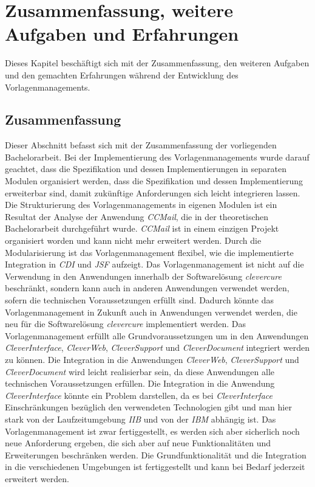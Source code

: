 \chapter{Zusammenfassung, weitere Aufgaben und Erfahrungen}
\label{cha:Zusammenfassung}
Dieses Kapitel beschäftigt sich mit der Zusammenfassung, den weiteren Aufgaben und den gemachten Erfahrungen während der Entwicklung des Vorlagenmanagements. 
\section{Zusammenfassung}
Dieser Abschnitt befasst sich mit der Zusammenfassung der vorliegenden  Bachelorarbeit.
\newline
\newline
Bei der Implementierung des Vorlagenmanagements wurde darauf geachtet, dass die Spezifikation und dessen Implementierungen in separaten Modulen organisiert werden, dass die Spezifikation und dessen Implementierung erweiterbar sind, damit zukünftige Anforderungen sich leicht integrieren lassen. Die Strukturierung des Vorlagenmanagements  in eigenen Modulen ist ein Resultat der Analyse der Anwendung \emph{CCMail}, die in der theoretischen Bachelorarbeit durchgeführt wurde. \emph{CCMail} ist in einem einzigen Projekt organisiert worden und kann nicht mehr erweitert werden. Durch die Modularisierung ist das Vorlagenmanagement flexibel, wie die implementierte Integration in \emph{CDI} und \emph{JSF} aufzeigt.
\newline
\newline
Das Vorlagenmanagement ist nicht auf die Verwendung in den Anwendungen innerhalb der Softwarelösung \emph{clevercure} beschränkt, sondern kann auch in anderen Anwendungen verwendet werden, sofern die technischen Voraussetzungen erfüllt sind. Dadurch könnte das Vorlagenmanagement in Zukunft auch in Anwendungen verwendet werden, die neu für die Softwarelösung \emph{clevercure} implementiert werden. 
\newline
\newline
Das Vorlagenmanagement erfüllt alle Grundvoraussetzungen um in den Anwendungen \emph{CleverInterface}, \emph{CleverWeb}, \emph{CleverSupport} und \emph{CleverDocument} integriert werden zu können. Die Integration in die Anwendungen \emph{CleverWeb}, \emph{CleverSupport} und \emph{CleverDocument} wird  leicht realisierbar sein, da diese Anwendungen alle technischen Voraussetzungen  erfüllen. Die Integration in die Anwendung \emph{CleverInterface} könnte ein Problem darstellen, da es bei \emph{CleverInterface} Einschränkungen bezüglich den verwendeten Technologien gibt und man hier stark von der Laufzeitumgebung \emph{IIB} und von der \emph{IBM} abhängig ist.  
\newline
\newline
Das Vorlagenmanagement ist zwar fertiggestellt, es werden sich aber sicherlich noch neue Anforderung ergeben, die sich aber auf neue Funktionalitäten und Erweiterungen beschränken werden. Die Grundfunktionalität und die Integration in die verschiedenen Umgebungen ist fertiggestellt und kann bei Bedarf jederzeit erweitert werden.

